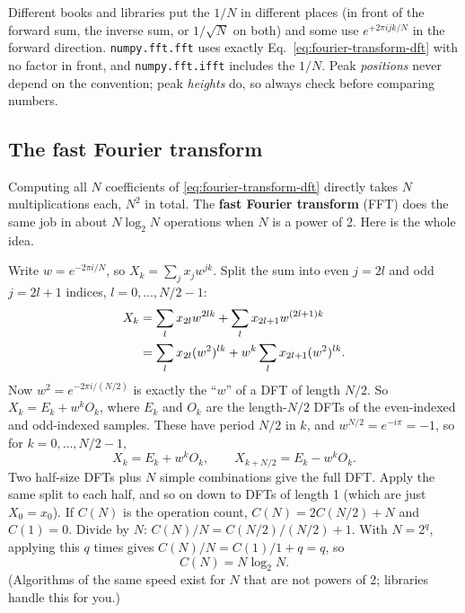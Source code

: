 \begin{pitfall}
Different books and libraries put the $1/N$ in different places (in front of the forward sum, the inverse sum, or $1/\sqrt N$ on both) and some use $e^{+2\pi ijk/N}$ in the forward direction. \texttt{numpy.fft.fft} uses exactly Eq.~\eqref{eq:fourier-transform-dft} with no factor in front, and \texttt{numpy.fft.ifft} includes the $1/N$. Peak \emph{positions} never depend on the convention; peak \emph{heights} do, so always check before comparing numbers.
\end{pitfall}

\subsection{The fast Fourier transform}

Computing all $N$ coefficients of \eqref{eq:fourier-transform-dft} directly takes $N$ multiplications each, $N^2$ in total. The \textbf{fast Fourier transform} (FFT) does the same job in about $N\log_2N$ operations when $N$ is a power of 2. Here is the whole idea.

Write $w=e^{-2\pi i/N}$, so $X_k=\sum_jx_jw^{jk}$. Split the sum into even $j=2l$ and odd $j=2l+1$ indices, $l=0,\dots,N/2-1$:
\begin{align}
X_k&=\sum_{l}x_{2l}w^{2lk}+\sum_lx_{2l+1}w^{(2l+1)k}\notag\\
&=\sum_lx_{2l}(w^2)^{lk}+w^k\sum_lx_{2l+1}(w^2)^{lk}.
\end{align}
Now $w^2=e^{-2\pi i/(N/2)}$ is exactly the ``$w$'' of a DFT of length $N/2$. So $X_k=E_k+w^kO_k$, where $E_k$ and $O_k$ are the length-$N/2$ DFTs of the even-indexed and odd-indexed samples. These have period $N/2$ in $k$, and $w^{N/2}=e^{-i\pi}=-1$, so for $k=0,\dots,N/2-1$,
\begin{equation}
X_k=E_k+w^kO_k,\qquad X_{k+N/2}=E_k-w^kO_k .
\label{eq:fourier-transform-butterfly}
\end{equation}
Two half-size DFTs plus $N$ simple combinations give the full DFT. Apply the same split to each half, and so on down to DFTs of length 1 (which are just $X_0=x_0$). If $C(N)$ is the operation count, $C(N)=2C(N/2)+N$ and $C(1)=0$. Divide by $N$: $C(N)/N=C(N/2)/(N/2)+1$. With $N=2^q$, applying this $q$ times gives $C(N)/N=C(1)/1+q=q$, so
\begin{equation}
C(N)=N\log_2N .
\end{equation}
(Algorithms of the same speed exist for $N$ that are not powers of 2; libraries handle this for you.)

